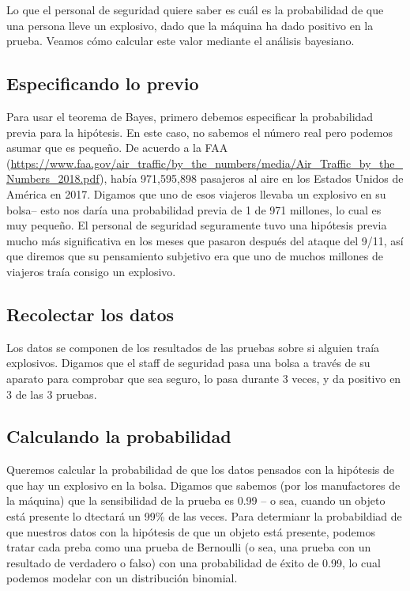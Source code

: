 \documentclass[
  12pt,
]{book}
\theoremstyle{definition}
\theoremstyle{definition}
\theoremstyle{definition}
\theoremstyle{remark}
\begin{document}
Lo que el personal de seguridad quiere saber es cuál es la probabilidad de que una persona lleve un explosivo, dado que la máquina ha dado positivo en la prueba. Veamos cómo calcular este valor mediante el análisis bayesiano.

\hypertarget{especificando-lo-previo}{%
\subsection{Especificando lo previo}\label{especificando-lo-previo}}

Para usar el teorema de Bayes, primero debemos especificar la probabilidad previa para la hipótesis. En este caso, no sabemos el número real pero podemos asumar que es pequeño. De acuerdo a la FAA (\url{https://www.faa.gov/air_traffic/by_the_numbers/media/Air_Traffic_by_the_Numbers_2018.pdf}), había 971,595,898 pasajeros al aire en los Estados Unidos de América en 2017. Digamos que uno de esos viajeros llevaba un explosivo en su bolsa-- esto nos daría una probabilidad previa de 1 de 971 millones, lo cual es muy pequeño. El personal de seguridad seguramente tuvo una hipótesis previa mucho más significativa en los meses que pasaron después del ataque del 9/11, así que diremos que su pensamiento subjetivo era que uno de muchos millones de viajeros traía consigo un explosivo.

\hypertarget{recolectar-los-datos}{%
\subsection{Recolectar los datos}\label{recolectar-los-datos}}

Los datos se componen de los resultados de las pruebas sobre si alguien traía explosivos. Digamos que el staff de seguridad pasa una bolsa a través de su aparato para comprobar que sea seguro, lo pasa durante 3 veces, y da positivo en 3 de las 3 pruebas.

\hypertarget{calculando-la-probabilidad}{%
\subsection{Calculando la probabilidad}\label{calculando-la-probabilidad}}

Queremos calcular la probabilidad de que los datos pensados con la hipótesis de que hay un explosivo en la bolsa. Digamos que sabemos (por los manufactores de la máquina) que la sensibilidad de la prueba es 0.99 -- o sea, cuando un objeto está presente lo dtectará un 99\% de las veces. Para determianr la probabildiad de que nuestros datos con la hipótesis de que un objeto está presente, podemos tratar cada preba como una prueba de Bernoulli (o sea, una prueba con un resultado de verdadero o falso) con una probabilidad de éxito de 0.99, lo cual podemos modelar con un distribución binomial.
\end{document}
